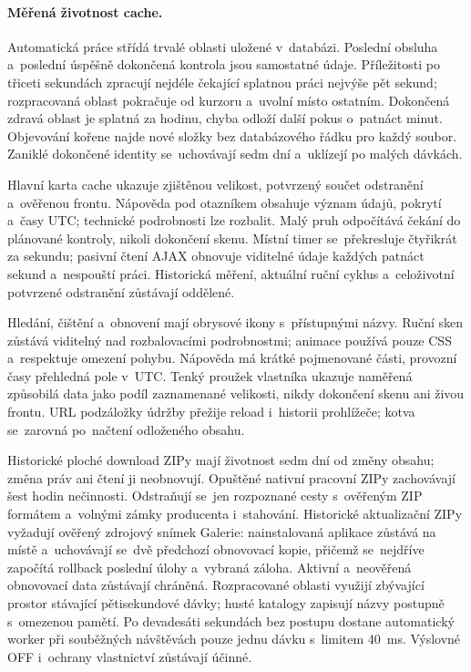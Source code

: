 \documentclass[11pt,a4paper]{article}
\begin{document}
\paragraph{Měřená životnost cache.}
Automatická práce střídá trvalé oblasti uložené v~databázi. Poslední obsluha
a~poslední úspěšně dokončená kontrola jsou samostatné údaje. Příležitosti po
třiceti sekundách zpracují nejdéle čekající splatnou práci nejvýše pět sekund;
rozpracovaná oblast pokračuje od kurzoru a~uvolní místo ostatním. Dokončená
zdravá oblast je splatná za hodinu, chyba odloží další pokus o~patnáct minut.
Objevování kořene najde nové složky bez databázového řádku pro každý soubor.
Zaniklé dokončené identity se~uchovávají sedm dní a~uklízejí po malých dávkách.

Hlavní karta cache ukazuje zjištěnou velikost, potvrzený součet odstranění
a~ověřenou frontu. Nápověda pod otazníkem obsahuje význam údajů, pokrytí a~časy
UTC; technické podrobnosti lze rozbalit. Malý pruh odpočítává čekání do
plánované kontroly, nikoli dokončení skenu. Místní timer se~překresluje
čtyřikrát za sekundu; pasivní čtení AJAX obnovuje viditelné údaje každých
patnáct sekund a~nespouští práci. Historická měření, aktuální ruční cyklus
a~celoživotní potvrzené odstranění zůstávají oddělené.

Hledání, čištění a~obnovení mají obrysové ikony s~přístupnými názvy. Ruční sken
zůstává viditelný nad rozbalovacími podrobnostmi; animace používá pouze CSS
a~respektuje omezení pohybu. Nápověda má krátké pojmenované části, provozní časy
přehledná pole v~UTC. Tenký proužek vlastníka ukazuje naměřená způsobilá data
jako podíl zaznamenané velikosti, nikdy dokončení skenu ani živou frontu. URL
podzáložky údržby přežije reload i~historii prohlížeče; kotva se~zarovná
po~načtení odloženého obsahu.

Historické ploché download ZIPy mají životnost sedm dní od změny obsahu; změna
práv ani čtení ji neobnovují. Opuštěné nativní pracovní ZIPy zachovávají šest
hodin nečinnosti. Odstraňují se~jen rozpoznané cesty s~ověřeným ZIP formátem
a~volnými zámky producenta i~stahování. Historické aktualizační ZIPy vyžadují
ověřený zdrojový snímek Galerie: nainstalovaná aplikace zůstává na místě
a~uchovávají se~dvě předchozí obnovovací kopie, přičemž se~nejdříve započítá
rollback poslední úlohy a~vybraná záloha. Aktivní a~neověřená obnovovací data
zůstávají chráněná. Rozpracované oblasti využijí zbývající prostor stávající
pětisekundové dávky; husté katalogy zapisují názvy postupně s~omezenou pamětí.
Po devadesáti sekundách bez postupu dostane automatický worker při souběžných
návštěvách pouze jednu dávku s~limitem 40~ms. Výslovné OFF i~ochrany vlastnictví
zůstávají účinné.
\end{document}
